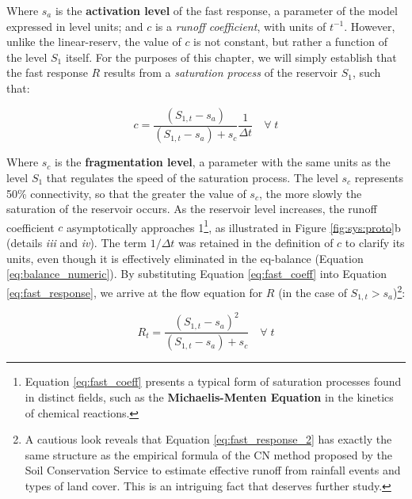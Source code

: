 \documentclass[./main_en.tex]{subfiles}
\begin{document}
Where $s_a$ is the \textbf{activation level} of the fast response, a parameter of the \gls{model} expressed in level units; and $c$ is a \textit{runoff coefficient}, with units of $t^{-1}$. However, unlike the \gls{linear-reserv}, the value of $c$ is not constant, but rather a function of the level $S_1$ itself. For the purposes of this chapter, we will simply establish that the fast response $R$ results from a \textit{saturation process} of the reservoir $S_1$, such that:
\begin{linenomath*}
\begin{equation} 
	\label{eq:fast_coeff}
	c = \frac{(S_{1,t} - s_a)}{(S_{1,t} - s_a) + s_c} \frac{1}{\Delta t} \quad \forall\;t
\end{equation}
\end{linenomath*}
\par Where $s_c$ is the \textbf{fragmentation level}, a parameter with the same units as the level $S_1$ that regulates the speed of the saturation process. The level $s_c$ represents 50\% connectivity, so that the greater the value of $s_c$, the more slowly the saturation of the reservoir occurs. As the reservoir level increases, the runoff coefficient $c$ asymptotically approaches 1\footnote{Equation \eqref{eq:fast_coeff} presents a typical form of saturation processes found in distinct fields, such as the \textbf{Michaelis-Menten Equation} in the kinetics of chemical reactions.}, as illustrated in Figure \ref{fig:sys:proto}b (details \textrm{\textit{iii}} and \textrm{\textit{iv}}). The term $1/ \Delta t$ was retained in the definition of $c$ to clarify its units, even though it is effectively eliminated in the \gls{eq-balance} (Equation \eqref{eq:balance_numeric}). By substituting Equation \eqref{eq:fast_coeff} into Equation \eqref{eq:fast_response}, we arrive at the flow equation for $R$ (in the case of $S_{1,t} > s_a$)\footnote{A cautious look reveals that Equation \eqref{eq:fast_response_2} has exactly the same structure as the empirical formula of the CN method proposed by the Soil Conservation Service to estimate effective runoff from rainfall events and types of land cover. This is an intriguing fact that deserves further study.}:
\begin{linenomath*}
\begin{equation} 
\label{eq:fast_response_2}
 R_{t} = \frac{(S_{1,t} - s_a)^2}{(S_{1,t} - s_a) + s_c} \quad \forall\;t
\end{equation}
\end{linenomath*}
\end{document}
